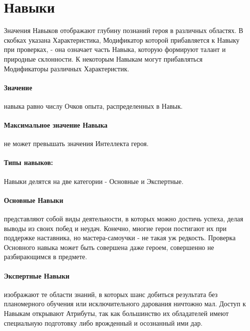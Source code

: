 \section{Навыки}
Значения Навыков отображают глубину познаний героя в различных областях. В скобках указана Характеристика, Модификатор которой прибавляется к Навыку при проверках, - она означает часть Навыка, которую формируют талант и природные склонности. К некоторым Навыкам могут прибавляться Модификаторы различных Характеристик.
\paragraph{Значение} навыка равно числу Очков опыта, распределенных в Навык.
\paragraph{Максимальное значение Навыка} не может превышать значения Интеллекта героя.
\paragraph{Типы навыков:} Навыки делятся на две категории - Основные и Экспертные.
\paragraph{Основные Навыки} представляют собой виды деятельности, в которых можно достичь успеха, делая выводы из своих побед и неудач. Конечно, многие герои постигают их при поддержке наставника, но мастера-самоучки - не такая уж редкость.
\newline Проверка Основного навыка может быть совершена даже героем, совершенно не разбирающимся в предмете.
\paragraph{Экспертные Навыки} изображают те области знаний, в которых шанс добиться результата без планомерного обучения или исключительного дарования ничтожно мал. Доступ к Навыкам открывают Атрибуты, так как большинство их обладателей имеют специальную подготовку либо врожденный и осознанный ими дар.

